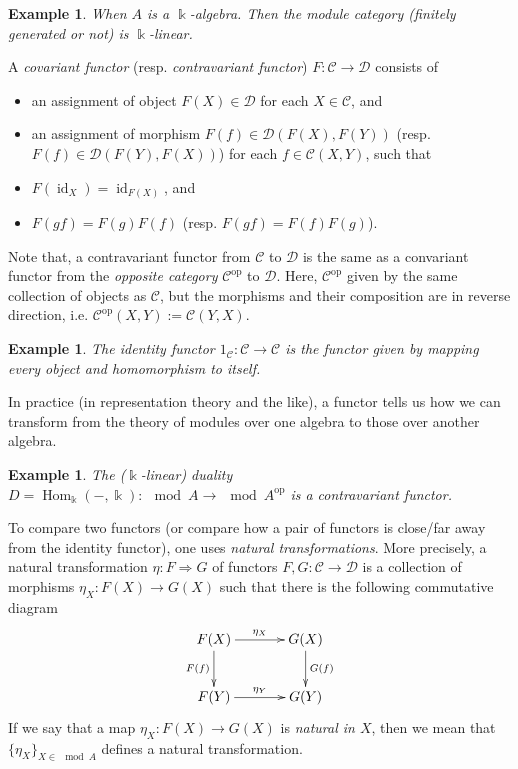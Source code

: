 \documentclass[11pt,a4paper]{article}
\numberwithin{equation}{section}
\theoremstyle{all}
\newtheorem{example}[theorem]{Example}
\theoremstyle{remark}
\newcommand{\CC}{\mathcal{C}}
\newcommand{\CD}{\mathcal{D}}
\newcommand{\id}{\operatorname{id}}
\newcommand{\Hom}{\operatorname{Hom}\nolimits}
\newcommand{\op}{\mathrm{op}}
\newcommand{\defn}[1]{\textsl{\color{darkblue} #1}}
\begin{document}
\begin{example}
When $A$ is a $\Bbbk$-algebra.
Then the module category (finitely generated or not) is $\Bbbk$-linear.
\end{example}

A \defn{covariant functor} (resp. \defn{contravariant functor}) $F:\CC\to \CD$ consists of 
\begin{itemize}
\item an assignment of object $F(X)\in\CD$ for each $X\in\CC$, and
\item an assignment of morphism $F(f)\in\CD(F(X),F(Y))$ (resp. $F(f)\in\CD(F(Y),F(X))$) for each $f\in \CC(X,Y)$, such that
\item $F(\id_X)=\id_{F(X)}$, and
\item $F(gf)=F(g)F(f)$ (resp. $F(gf)=F(f)F(g)$).
\end{itemize}
Note that, a contravariant functor from $\CC$ to $\CD$ is the same as a convariant functor from the \defn{opposite category} $\CC^\op$ to $\CD$.  Here, $\CC^\op$ given by the same collection of objects as $\CC$, but the morphisms and their composition are in reverse direction, i.e. $\CC^\op(X,Y):=\CC(Y,X)$. 


\begin{example}
The \defn{identity functor} $1_\CC:\CC\to \CC$ is the functor given by mapping every object and homomorphism to itself.
\end{example}

In practice (in representation theory and the like), a functor tells us how we can transform from the theory of modules over one algebra to those over another algebra.

\begin{example}
The ($\Bbbk$-linear) duality $D=\Hom_{\Bbbk}(-,\Bbbk):\mod A\to \mod A^\op$ is a contravariant functor.
\end{example}

To compare two functors (or compare how a pair of functors is close/far away from the identity functor), one uses \defn{natural transformations}.
More precisely, a natural transformation $\eta:F\Rightarrow G$ of functors $F,G:\CC\to \CD$ is a collection of morphisms $\eta_X:F(X)\to G(X)$ such that there is the following commutative diagram
\[
\xymatrix@C=35pt@R=25pt{ 
F(X) \ar[r]^{\eta_X} \ar[d]_{F(f)} & G(X) \ar[d]^{G(f)} \\
F(Y) \ar[r]^{\eta_Y} & G(Y) 
}
\]
If we say that a map $\eta_X:F(X)\to G(X)$ is \defn{natural in $X$}, then we mean that $\{\eta_X\}_{X\in \mod A}$ defines a natural transformation.
\end{document}
